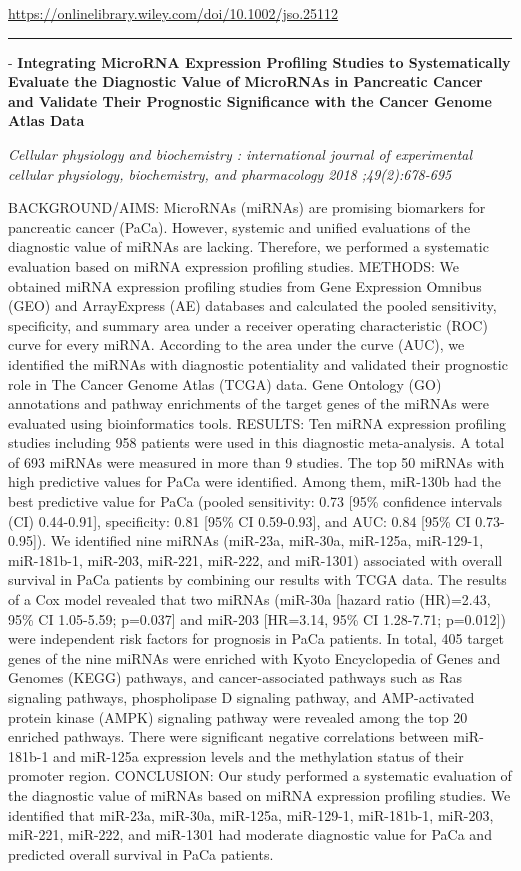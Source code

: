 \documentclass[]{article}
\begin{document}
\url{https://onlinelibrary.wiley.com/doi/10.1002/jso.25112}

\begin{center}\rule{0.5\linewidth}{\linethickness}\end{center}

 - \textbf{Integrating MicroRNA Expression Profiling Studies to
Systematically Evaluate the Diagnostic Value of MicroRNAs in Pancreatic
Cancer and Validate Their Prognostic Significance with the Cancer Genome
Atlas Data}

\emph{Cellular physiology and biochemistry : international journal of
experimental cellular physiology, biochemistry, and pharmacology 2018
;49(2):678-695}

BACKGROUND/AIMS: MicroRNAs (miRNAs) are promising biomarkers for
pancreatic cancer (PaCa). However, systemic and unified evaluations of
the diagnostic value of miRNAs are lacking. Therefore, we performed a
systematic evaluation based on miRNA expression profiling studies.
METHODS: We obtained miRNA expression profiling studies from Gene
Expression Omnibus (GEO) and ArrayExpress (AE) databases and calculated
the pooled sensitivity, specificity, and summary area under a receiver
operating characteristic (ROC) curve for every miRNA. According to the
area under the curve (AUC), we identified the miRNAs with diagnostic
potentiality and validated their prognostic role in The Cancer Genome
Atlas (TCGA) data. Gene Ontology (GO) annotations and pathway
enrichments of the target genes of the miRNAs were evaluated using
bioinformatics tools. RESULTS: Ten miRNA expression profiling studies
including 958 patients were used in this diagnostic meta-analysis. A
total of 693 miRNAs were measured in more than 9 studies. The top 50
miRNAs with high predictive values for PaCa were identified. Among them,
miR-130b had the best predictive value for PaCa (pooled sensitivity:
0.73 {[}95\% confidence intervals (CI) 0.44-0.91{]}, specificity: 0.81
{[}95\% CI 0.59-0.93{]}, and AUC: 0.84 {[}95\% CI 0.73-0.95{]}). We
identified nine miRNAs (miR-23a, miR-30a, miR-125a, miR-129-1,
miR-181b-1, miR-203, miR-221, miR-222, and miR-1301) associated with
overall survival in PaCa patients by combining our results with TCGA
data. The results of a Cox model revealed that two miRNAs (miR-30a
{[}hazard ratio (HR)=2.43, 95\% CI 1.05-5.59; p=0.037{]} and miR-203
{[}HR=3.14, 95\% CI 1.28-7.71; p=0.012{]}) were independent risk factors
for prognosis in PaCa patients. In total, 405 target genes of the nine
miRNAs were enriched with Kyoto Encyclopedia of Genes and Genomes (KEGG)
pathways, and cancer-associated pathways such as Ras signaling pathways,
phospholipase D signaling pathway, and AMP-activated protein kinase
(AMPK) signaling pathway were revealed among the top 20 enriched
pathways. There were significant negative correlations between
miR-181b-1 and miR-125a expression levels and the methylation status of
their promoter region. CONCLUSION: Our study performed a systematic
evaluation of the diagnostic value of miRNAs based on miRNA expression
profiling studies. We identified that miR-23a, miR-30a, miR-125a,
miR-129-1, miR-181b-1, miR-203, miR-221, miR-222, and miR-1301 had
moderate diagnostic value for PaCa and predicted overall survival in
PaCa patients.
\end{document}

